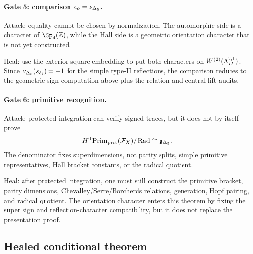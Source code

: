\paragraph{Gate 5: comparison \(\epsilon_o=\nu_{\Delta_5}\).}
Attack: equality cannot be chosen by normalization.  The automorphic
side is a character of \(\Sp_4(\Z)\), while the Hall side is a
geometric orientation character that is not yet constructed.

Heal: use the exterior-square embedding to put both characters on
\(W^{(2)}(\Lambda^{2,1}_{II})\).  Since \(\nu_{\Delta_5}(s_{\delta_i})=-1\) for
the simple type-II reflections, the comparison reduces to the geometric
sign computation above plus the relation and central-lift audits.

\paragraph{Gate 6: primitive recognition.}
Attack: protected integration can verify signed traces, but it does not
by itself prove
\[
  H^0\operatorname{Prim}_{\mathrm{prot}}(\mathcal F_X)/\operatorname{Rad}
  \cong
  \mathfrak g_{\Delta_5} .
\]
The denominator fixes superdimensions, not parity splits, simple
primitive representatives, Hall bracket constants, or the radical
quotient.

Heal: after protected integration, one must still construct the
primitive bracket, parity dimensions, Chevalley/Serre/Borcherds
relations, generation, Hopf pairing, and radical quotient.  The
orientation character enters this theorem by fixing the super sign and
reflection-character compatibility, but it does not replace the
presentation proof.

\subsection{Healed conditional theorem}

